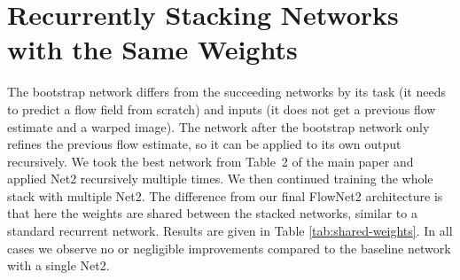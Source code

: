 \documentclass[10pt,twocolumn,letterpaper]{article}%
\newcommand{\sinc}[1]{\textcolor{blue}{#1}}
\newcommand{\kitc}[1]{\textcolor{dgreen}{#1}}
\newcommand{\chairs}{\mbox{Chairs}\xspace}
\newcommand{\things}{\mbox{Things3D}\xspace}
\newcommand{\netb}{Net2\xspace}
\begin{document}

\section{Recurrently Stacking Networks with the Same Weights} 

The bootstrap network differs from the succeeding networks by its task (it needs to predict a flow field from scratch) and inputs (it does not get a previous flow estimate and a warped image). The network after the bootstrap network only refines the previous flow estimate, so it can be applied to its own output recursively. We took the best network from Table~2 of the main paper and applied \netb recursively multiple times. We then continued training the whole stack with multiple \netb. The difference from our final FlowNet2 architecture is that here the weights are shared between the stacked networks, similar to a standard recurrent network. Results are given in Table \ref{tab:shared-weights}. In all cases we observe no or negligible improvements compared to the baseline network with a single \netb .
\end{document}
